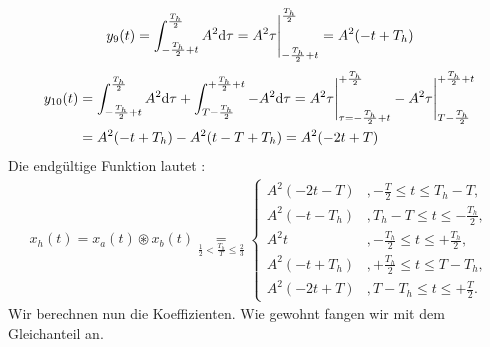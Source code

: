 \documentclass[11pt,a4paper,DIV=12]{scrartcl}
\begin{document}
%
%
\begin{align}
	y_9(t)=\int_{-\frac{T_h}{2}+t}^{\frac{T_h}{2}}A^2\mathrm{d} \tau=A^2\tau\Bigg |_{-\frac{T_h}{2}+t}^{\frac{T_h}{2}}=A^2(-t+T_h)
\end{align}
%
%
\begin{align}
	y_{10}(t)&=\int_{-\frac{T_h}{2}+t}^{\frac{T_h}{2}}A^2\mathrm{d} \tau+\int_{T-\frac{T_h}{2}}^{+\frac{T_h}{2}+t}-A^2\mathrm{d} \tau=A^2\tau\Bigg |_{\tau=-\frac{T_h}{2}+t}^{+\frac{T_h}{2}}-A^2\tau\Bigg |_{T-\frac{T_h}{2}}^{+\frac{T_h}{2}+t}\nonumber \\
	&=A^2(-t+T_h)-A^2(t-T+T_h)=A^2(-2t+T)
\end{align}
%
%
Die endgültige Funktion lautet :
%
%
\begin{align}
	x_{h}(t)=x_{a}(t)\circledast x_{b}(t)
	\underset{\frac{1}{2}<\frac{T_h}{T}\leq \frac{2}{3}}{=}
	\begin{cases}
		A^2(-2t-T) &,-\frac{T}{2}\leq t\leq  T_h-T, \\
		A^2(-t-T_h)&,T_h-T\leq t \leq -\frac{T_h}{2},\\
		A^2t &,-\frac{T_h}{2}\leq t \leq +\frac{T_h}{2},\\
		A^2(-t+T_h) &,+\frac{T_h}{2}\leq t \leq T-T_h, \\
		A^2(-2t+T) &,T-T_h \leq t \leq +\frac{T}{2}.
	\end{cases}
\end{align}
%
%
Wir berechnen nun die Koeffizienten. Wie gewohnt fangen wir mit dem Gleichanteil an.
%
%
\end{document}
